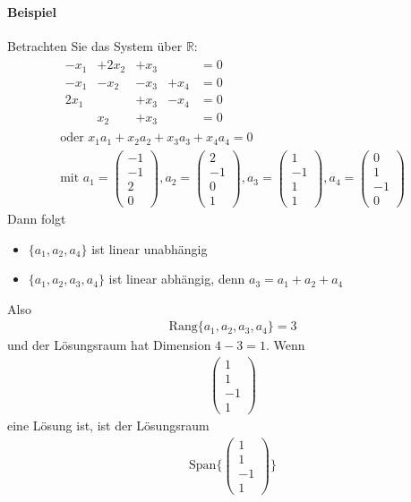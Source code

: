 \documentclass[11pt]{report}
\newcommand*\Zb[1] {\mathbb{#1}}
\begin{document}
\paragraph{Beispiel}
Betrachten Sie das System über $\Zb{R}$:
\begin{align}
 \begin{matrix}
  -x_1 & +2x_2 & +x_3 & & =0 \\
  -x_1 & -x_2 & -x_3  & +x_4 & =0 \\
  2x_1 & & +x_3 & -x_4 & =0 \\
  & x_2 & +x_3 & & =0
 \end{matrix} \\
\text{oder } x_1 a_1 + x_2 a_2 + x_3 a_3 + x_4 a_4 = 0 \\
\text{mit } a_1 =\begin{pmatrix} -1 \\-1 \\ 2 \\ 0 \end{pmatrix}, a_2 = \begin{pmatrix} 2 \\ -1 \\ 0 \\ 1\end{pmatrix}, a_3 = \begin{pmatrix} 1 \\ -1 \\ 1 \\ 1\end{pmatrix}, a_4 = \begin{pmatrix} 0 \\ 1 \\ -1 \\ 0 \end{pmatrix}
\end{align}
Dann folgt
\begin{itemize}
 \item $\{a_1, a_2, a_4\}$ ist linear unabhängig
 \item $\{a_1, a_2, a_3, a_4\}$ ist linear abhängig, denn $a_3 = a_1 + a_2 + a_4$
\end{itemize}
Also
\begin{align}
 \text{Rang}\{a_1, a_2, a_3, a_4\} = 3 
\end{align}
und der Lösungsraum hat Dimension $4-3=1$.
Wenn
\begin{align}
 \begin{pmatrix} 1 \\ 1 \\ -1 \\ 1 \end{pmatrix}
\end{align}
eine Lösung ist, ist der Lösungsraum
\begin{align}
 \text{Span}\{\begin{pmatrix} 1 \\ 1 \\ -1 \\ 1 \end{pmatrix}\}
\end{align}
\end{document}
